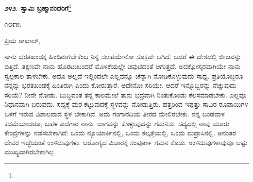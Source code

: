\begin{center}
\textbf{೨೪೨. ಸ್ವಾಮಿ ಬ್ರಹ್ಮಾನಂದರಿಗೆ}\footnote{}
\end{center}
\vspace{-0.3cm}

\begin{flushright}
೧೮೯೫.
\end{flushright}

\noindent
ಪ್ರಿಯ ರಾಖಾಲ್,

ನಾನು ಭರತಖಂಡಕ್ಕೆ ಹಿಂದಿರುಗಬೇಕೆಂಬ ನಿನ್ನ ಸಲಹೆಯೇನೋ ಸೂಕ್ತವೇ ಆಗಿದೆ. ಆದರೆ ಈ ದೇಶದಲ್ಲಿ ಬೀಜವನ್ನು ಬಿತ್ತಿದೆ. ತಕ್ಷಣವೇ ನಾನು ಹೊರಟುಬಂದರೆ ಮೊಳಕೆಯಲ್ಲೇ ಚಿವುಟಿದಂತೆ ಆಗುತ್ತದೆ. ಅದಕ್ಕೋಸ್ಕರವಾಗಿಯೇ ನಾನು ಸ್ವಲ್ಪಕಾಲ ತಾಳಬೇಕು. ಅದೂ ಅಲ್ಲದೆ ಇಲ್ಲಿಂದಲೇ ಎಲ್ಲವನ್ನೂ ಚೆನ್ನಾಗಿ ನೋಡಿಕೊಳ್ಳುವುದು ಸಾಧ್ಯ. ಪ್ರತಿಯೊಬ್ಬರೂ ನನ್ನನ್ನು ಭರತಖಂಡಕ್ಕೆ ಹಿಂತಿರುಗಿ ಎಂದು ಕೋರುತ್ತಾರೆ. ಅದೇನೋ ಸರಿಯೇ. ಆದರೆ ಇನ್ನೊಬ್ಬರನ್ನು ನೆಚ್ಚುವುದು ಸರಿಯೆ? ನೀನೇ ನೋಡು. ಬುದ್ಧಿವಂತ ತನ್ನ ಕಾಲಮೇಲೆ ತಾನು ಭದ್ರವಾಗಿ ನಿಂತುಕೊಂಡು ಕೆಲಸಮಾಡಬೇಕು. ಎಲ್ಲವೂ ನಿಧಾನವಾಗಿ ಬರುವದು. ಸದ್ಯಕ್ಕೆ ಮಠ ಕಟ್ಟುವುದಕ್ಕೆ ಸ್ಥಳವನ್ನು ನೋಡುತ್ತಿರು. ಹತ್ತರಿಂದ ಇಪ್ಪತ್ತು ಸಾವಿರ ರೂಪಾಯಿಗಳ ಒಳಗೆ ಇರುವ ವಿಶಾಲವಾದ ಸ್ಥಳ ಬೇಕಾಗಿದೆ. ಅದು ಗಂಗಾನದಿಯ ತೀರದ ಮೇಲಿರಬೇಕು. ನನ್ನ ಬಂಡವಾಳ ಕಡಮೆಯಾದರೂ, ಬಹಳ ಎದೆಗಾರ ನಾನು. ಜಾಗವನ್ನು ಕೊಳ್ಳುವುದನ್ನು ಗಮನಿಸು. ಸದ್ಯದಲ್ಲಿ ನಾವು ಮೂರು ಕೇಂದ್ರಗಳನ್ನು ನಡೆಸಬೇಕಾಗಿದೆ: ಒಂದು ನ್ಯೂಯಾರ್ಕಿನಲ್ಲಿ, ಒಂದು ಕಲ್ಕತ್ತೆಯಲ್ಲಿ, ಒಂದು ಮದ್ರಾಸಿನಲ್ಲಿ. ಅನಂತರ ದೇವರ ಇಚ್ಛೆಯಂತೆ ಉಳಿದುವುಗಳು. ಆರೋಗ್ಯದ ವಿಚಾರಕ್ಕೆ ಸಂಪೂರ್ಣ ಗಮನ ಕೊಡು. ಉಳಿದುವುಗಳಾವುವೂ ಅಷ್ಟು ಮುಖ್ಯವಾಗಿರಬೇಕಾಗಿಲ್ಲ.

